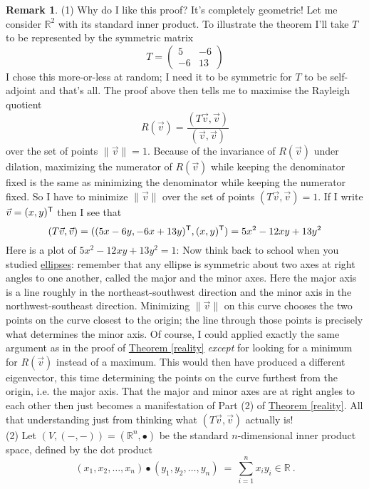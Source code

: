 \documentclass[11pt]{amsbook}
\def\RR{{\mathbb R}}
\theoremstyle{definition}
\newtheorem{rem}[theorem]{Remark}
\begin{document}
\begin{rem}\label{ellipses}
(1) Why do I like this proof? It's completely geometric! Let me consider $\mathbb{R}^2$ with its standard inner product. To illustrate the theorem I'll take $T$ to be represented by the symmetric matrix $$T = \begin{pmatrix} 5 & -6 \\ -6 & 13 \end{pmatrix}$$ I chose this more-or-less at random; I need it to be symmetric for $T$ to be self-adjoint and that's all.  The proof above then tells me to maximise the Rayleigh quotient $$R(\vec{v}) = \frac{(T\vec{v}, \vec{v})}{(\vec{v}, \vec{v})}$$ over the set of points $\|\vec{v} \|=1$. Because of the invariance of $R(\vec{v})$ under dilation, maximizing the numerator of $R(\vec{v})$ while keeping the denominator fixed is the same as minimizing the denominator while keeping the numerator fixed.  So I have to minimize $\|\vec{v}\|$ over the set of points $(T\vec{v}, \vec{v}) = 1$. If I write $\vec{v} = (x,y)^{\sf T}$ then I see that $$(T\vec{v}, \vec{v}) = ((5x-6y, -6x + 13y)^{\sf T}, (x,y)^{\sf T}) = 5x^2 - 12xy + 13y^2$$ Here is a plot of $5x^2 - 12xy + 13y^2 = 1$:
Now think back to school when you studied \href{http://en.wikipedia.org/wiki/Ellipse}{ellipses}: remember that any ellipse is symmetric about two axes at right angles to one another, called the major and the minor axes. Here the major axis is a line roughly in the northeast-southwest direction and the minor axis in the northwest-southeast direction. Minimizing $\|\vec{v}\|$ on this curve chooses the two points on the curve closest to the origin; the line through those points is precisely what determines the minor axis. Of course, I could applied exactly the same argument as in the proof of \hyperref[reality]{Theorem \ref{reality}} {\it except} for looking for a minimum for $R(\vec{v})$ instead of a maximum. This would then have produced a different eigenvector, this time determining the points on the curve furthest from the origin, i.e. the major axis. That the major and minor axes are at right angles to each other then just becomes a manifestation of Part (2) of
 \hyperref[reality]{Theorem \ref{reality}}. All that understanding just from thinking what $(T\vec{v}, \vec{v})$ actually is!\\
(2) Let $(V,(-,-))=(\RR^n,\bullet)$ be the standard $n$-dimensional inner product space, defined by the dot product
$$(x_1,x_2,\dots,x_n) \bullet (y_1,y_2,\dots,y_n)~=~\sum\limits^n_{i=1}x_iy_i \in \RR~.$$

\end{rem}
\end{document}
